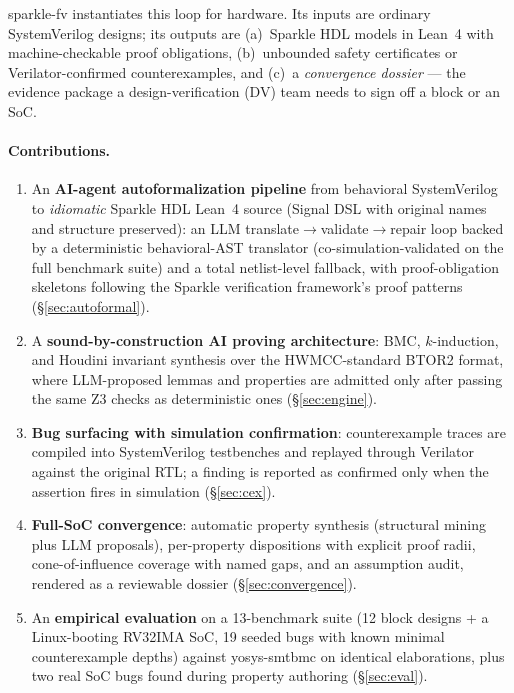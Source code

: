 \documentclass[11pt]{article}
\newcommand{\sfv}{\textsf{sparkle-fv}}
\newcommand{\tool}[1]{\textsf{#1}}
\begin{document}
\sfv{} instantiates this loop for hardware. Its inputs are ordinary
SystemVerilog designs; its outputs are (a)~Sparkle HDL models in Lean~4 with
machine-checkable proof obligations, (b)~unbounded safety certificates or
Verilator-confirmed counterexamples, and (c)~a \emph{convergence dossier}
--- the evidence package a design-verification (DV) team needs to sign off
a block or an SoC.

\paragraph{Contributions.}
\begin{enumerate}
  \item An \textbf{AI-agent autoformalization pipeline} from behavioral
        SystemVerilog to \emph{idiomatic} Sparkle HDL Lean~4 source
        (Signal DSL with original names and structure preserved): an LLM
        translate$\to$validate$\to$repair loop backed by a deterministic
        behavioral-AST translator (co-simulation-validated on the full
        benchmark suite) and a total netlist-level fallback, with
        proof-obligation skeletons following the Sparkle verification
        framework's proof patterns (\S\ref{sec:autoformal}).
  \item A \textbf{sound-by-construction AI proving architecture}: BMC,
        $k$-induction, and Houdini invariant synthesis over the
        HWMCC-standard BTOR2 format, where LLM-proposed lemmas and
        properties are admitted only after passing the same Z3 checks as
        deterministic ones (\S\ref{sec:engine}).
  \item \textbf{Bug surfacing with simulation confirmation}: counterexample
        traces are compiled into SystemVerilog testbenches and replayed
        through Verilator against the original RTL; a finding is reported
        as confirmed only when the assertion fires in simulation
        (\S\ref{sec:cex}).
  \item \textbf{Full-SoC convergence}: automatic property synthesis
        (structural mining plus LLM proposals), per-property dispositions
        with explicit proof radii, cone-of-influence coverage with named
        gaps, and an assumption audit, rendered as a reviewable dossier
        (\S\ref{sec:convergence}).
  \item An \textbf{empirical evaluation} on a 13-benchmark suite (12 block
        designs + a Linux-booting RV32IMA SoC, 19 seeded bugs with known
        minimal counterexample depths) against \tool{yosys-smtbmc} on
        identical elaborations, plus two real SoC bugs found during
        property authoring (\S\ref{sec:eval}).
\end{enumerate}
\end{document}
